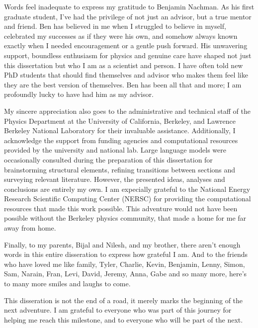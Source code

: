 \begin{acknowledgements}
    Words feel inadequate to express my gratitude to Benjamin Nachman.
    As his first graduate student, I've had the privilege of not just an advisor, but a true mentor and friend.
    Ben has believed in me when I struggled to believe in myself, celebrated my successes as if they were his own, and somehow always known exactly when I needed encouragement or a gentle push forward.
    His unwavering support, boundless enthusiasm for physics and genuine care have shaped not just this dissertation but who I am as a scientist and person.
    I have often told new PhD students that should find themselves and advisor who makes them feel like they are the best version of themselves.
    Ben has been all that and more;
    I am profoundly lucky to have had him as my advisor.
    
    My sincere appreciation also goes to the administrative and technical staff of the Physics Department at the University of California, Berkeley, and Lawrence Berkeley National Laboratory for their invaluable assistance.
    Additionally, I acknowledge the support from funding agencies and computational resources provided by the university and national lab.
    Large language models were occasionally consulted during the preparation of this dissertation for brainstorming structural elements, refining transitions between sections and surveying relevant literature. However, the presented ideas, analyses and conclusions are entirely my own.
    I am expecially grateful to the National Energy Research Scientific Computing Center (NERSC) for providing the computational resources that made this work possible.
    This adventure would not have been possible without the Berkeley physics community, that made a home for me far away from home.
    
    Finally, to my parents, Bijal and Nilesh, and my brother, there aren't enough words in this entire disseration to express how grateful I am.
    And to the friends who have loved me like family, Tyler, Charlie, Kevin, Benjamin, Lenny, Simon, Sam, Narain, Fran, Levi, David, Jeremy, Anna, Gabe and so many more, here's to many more smiles and laughs to come.

    This disseration is not the end of a road, it merely marks the beginning of the next adventure.
    I am grateful to everyone who was part of this journey for helping me reach this milestone, and to everyone who will be part of the next.
    
\end{acknowledgements}